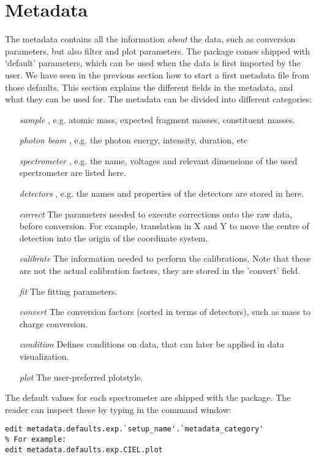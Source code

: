 \section{Metadata}
The metadata contains all the information \emph{about} the data, such as conversion parameters, but also filter and plot parameters. The package comes shipped with `default' parameters, which can be used when the data is first imported by the user. We have seen in the previous section how to start a first metadata file from those defaults. This section explains the different fields in the metadata, and what they can be used for. The metadata can be divided into different categories:

\begin{itemize}
\item[\emph{sample}], e.g. atomic mass, expected fragment masses, constituent masses.
\item[\emph{photon beam}], e.g. the photon energy, intensity, duration, etc
\item[\emph{spectrometer}],  e.g. the name, voltages and relevant dimensions of the used spectrometer are listed here.
\item[\emph{detectors}], e.g. the names and properties of the detectors are stored in here.
\item[\emph{correct}] The parameters needed to execute corrections onto the raw data, before conversion. For example, translation in X and Y to move the centre of detection into the origin of the coordinate system.
\item[\emph{calibrate}] The information needed to perform the calibrations. Note that these are not the actual calibration factors, they are stored in the 'convert' field.
\item[\emph{fit}] The fitting parameters.
\item[\emph{convert}] The conversion factors (sorted in terms of detectors), such as mass to charge conversion.
\item[\emph{condition}] Defines conditions on data, that can later be applied in data visualization.
\item[\emph{plot}] The user-preferred plotstyle.
\end{itemize}

The default values for each spectrometer are shipped with the package. The reader can inspect these by typing in the command window:

\lstset{language=MATLAB}
\begin{lstlisting}
edit metadata.defaults.exp.`setup_name'.`metadata_category'
% For example:
edit metadata.defaults.exp.CIEL.plot
\end{lstlisting}


